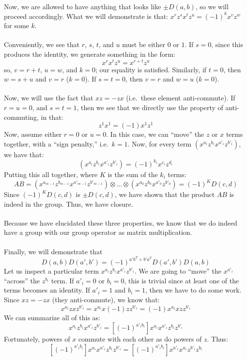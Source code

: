 \documentclass[letterpaper]{article}
\begin{document}
Now, we are allowed to have anything that looks like $ \pm D(a, b) $, so we will proceed accordingly.
What we will demonstrate is that:
$ x^r z^s x^t z^u = {(-1)}^k x^v z^w $
for some $ k $.
\\ \\
Conveniently, we see that $ r $, $ s $, $ t $, and $ u $ must be either $ 0 $ or $ 1 $.
If $ s = 0 $, since this produces the identity, we generate something in the form:
\[
x^r x^t z^u = x^{r + t} z^u
\]
so, $ v = r + t $, $ u = w $, and $ k = 0 $; our equality is satisfied.
Similarly, if $ t = 0 $, then $ w = s + u $ and $ v = r $ ($ k = 0 $).
If $ s = t = 0 $, then $ v = r $ and $ w = u $ ($ k = 0 $).
\\ \\
Now, we will use the fact that $ xz = -zx $ (i.e.\ these element anti-commute).
If $ r = u = 0 $, and $ s = t = 1 $, then we see that we directly use the property of anti-commuting, in that:
\[
z^1 x^1 = (-1) x^1 z^1
\]
Now, assume either $ r = 0 $ or $ u = 0 $.
In this case, we can ``move'' the $ z $ or $ x $ terms together, with a ``sign penalty,'' i.e.\ $ k = 1 $.
Now, for every term $ (x^{a_{i}} z^{b_{i}} x^{a'_{i}} z^{b'_{i}}) $, we have that:
\[
(x^{a_{i}} z^{b_{i}} x^{a'_{i}} z^{b'_{i}}) = {(-1)}^{k_i} x^{c_i} z^{d_i}
\]
Putting this all together, where $ K $ is the sum of the $ k_i $ terms:
\[
AB = (x^{a_{m - 1}} z^{b_{m - 1}} x^{a'_{m - 1}} z^{b'_{m - 1}}) \otimes \ldots \otimes (x^{a_{0}} z^{b_{0}} x^{a'_{0}} z^{b'_{0}}) = {(-1)}^{K} D(c, d)
\]
Since $ {(-1)}^{K} D(c, d) $ is $ \pm D(c, d) $, we have shown that the product $ AB $ is indeed in the group.
Thus, we have closure.
\\ \\
Because we have elucidated these three properties, we know that we do indeed have a group with our group operator as matrix multiplication.
\\ \\
Finally, we will demonstrate that
\[
D(a,b) D(a', b') = {(-1)}^{a'b^T + b'a^T} D(a', b') D(a, b)
\]
Let us inspect a particular term $ x^{a_i} z^{b_i} x^{a'_i} z^{b'_i} $.
We are going to ``move'' the $ x^{a'_i} $ ``across'' the $ z^{b_i} $ term.
If $ a'_i = 0 $ or $ b_i = 0 $, this is trivial since at least one of the terms becomes an identity.
If $ a'_i = 1 $ and $ b_i = 1 $, then we have to do some work.
Since $ xz = -zx $ (they anti-commute), we know that:
$$ x^{a_i} zx z^{b'_i} = x^{a_i} x(-1)z z^{b'_i} = (-1) x^{a_i} xz z^{b'_i} $$
We can summarize all of this as:
$$ x^{a_i} z^{b_i} x^{a'_i} z^{b'_i} = \left[{(-1)}^{a'_i b_i} \right] x^{a_i} x^{a'_i} z^{b_i} z^{b'_i} $$
Fortunately, powers of $ x $ commute with each other as do powers of $ z $.
Thus:
\[
\left[{(-1)}^{a'_i b_i} \right] x^{a_i} x^{a'_i} z^{b_i} z^{b'_i} =
\left[{(-1)}^{a'_i b_i} \right] x^{a'_i} x^{a_i} z^{b'_i} z^{b_i}
\]
\end{document}
